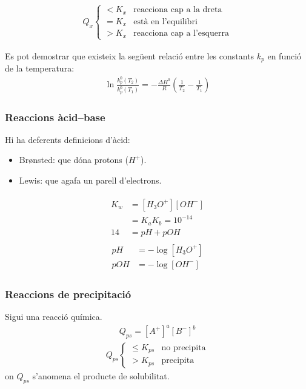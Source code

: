 \begin{align*}
    Q_{x} \begin{cases} < K_{x} & \text{reacciona cap a la dreta} \\ = K_{x} & \text{està en l'equilibri} \\ > K_{x} & \text{reacciona cap a l'esquerra} \end{cases}
\end{align*}

Es pot demostrar que existeix la següent relació entre les constants $k_p$ en funció de la temperatura:
\begin{align}
    \ln \frac{k_{p}^{0}({T_2})}{k_{p}^{0}(T_1)} = - \frac{\Delta H^{0}}{R} \left( \frac{1}{T_{2}} - \frac{1}{T_{1}} \right)
\end{align}
\subsubsection*{Reaccions àcid--base}
Hi ha deferents definicions d'àcid:
\begin{itemize}
    \item Brønsted: que dóna protons ($H^{+}$).
    \item Lewis: que agafa un parell d'electrons.
\end{itemize}

\begin{align}
\begin{aligned}
    K_{w} &= [H_{3}O^{+}] [OH^{-}] \\ &= K_{a} K_{b} = 10^{-14} \\
    14 &= pH + pOH
\end{aligned}
\end{align}
\begin{align}
\begin{aligned}
    pH &= -\log [H_{3}O^{+}] \\
    pOH &= - \log [OH^{-}]
\end{aligned}
\end{align}
\subsubsection*{Reaccions de precipitació}
Sigui  una reacció química.
\begin{align}
    Q_{ps} = [A^+]^{a} [B^-]^{b}
\end{align}
\begin{align*}
    Q_{ps}  \begin{cases} \leq K_{ps} & \text{no precipita} \\ > K_{ps} & \text{precipita} \end{cases}
\end{align*}
on $Q_{ps}$ s'anomena el producte de solubilitat.
